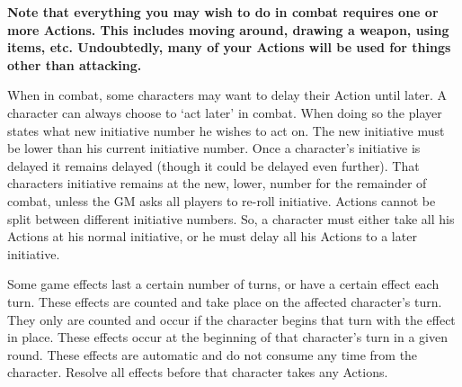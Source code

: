 \documentclass[twoside]{book}
\begin{document}
 \textbf{ Note that everything you may wish to do in combat
             requires one or more Actions. This includes moving around,
             drawing a weapon, using items, etc. Undoubtedly, many of
             your Actions will be used for things other than attacking.
             }


    {  
    When in combat, some characters may want to delay
             their Action until later. A character can always choose to
             `act later' in combat. When doing so the player
             states what new initiative number he wishes to act on. The
             new initiative must be lower than his current initiative
             number. Once a character's initiative is delayed it
             remains delayed (though it could be delayed even further).
             That characters initiative remains at the new, lower, number
             for the remainder of combat, unless the GM asks all players
             to re-roll initiative. Actions cannot be split between
             different initiative numbers. So, a character must either
             take all his Actions at his normal initiative, or he must
             delay all his Actions to a later initiative. 
    }
  
  

  

  
    {  
    Some game effects last a certain number of turns, or
             have a certain effect each turn. These effects are counted
             and take place on the affected character's turn. They
             only are counted and occur if the character begins that turn
             with the effect in place. These effects occur at the
             beginning of that character's turn in a given round.
             These effects are automatic and do not consume any time from
             the character. Resolve all effects before that character
             takes any Actions. 
    }
  
\end{document}
